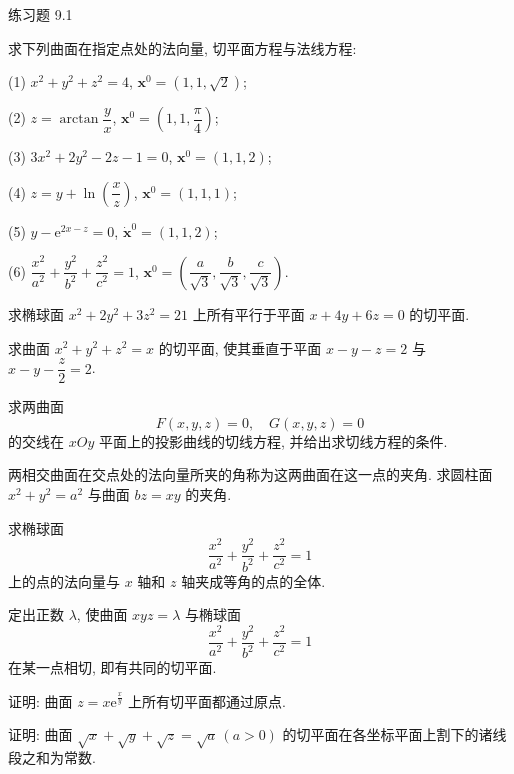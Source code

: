 \begin{exblock}{练习题 9.1}
  \item 求下列曲面在指定点处的法向量, 切平面方程与法线方程:

  (1) $x^{2} + y^{2} + z^{2} = 4$, $\boldsymbol{x}^{0} = \left(1, 1, \sqrt{2}\right)$;

  (2) $z = \arctan \dfrac{y}{x}$, $\boldsymbol{x}^{0} = \left(1, 1, \dfrac{\pi}{4}\right)$;

  (3) $3x^{2} + 2y^{2} - 2z - 1 = 0$, $\boldsymbol{x}^{0} = (1, 1, 2)$;

  (4) $z = y + \ln\left(\dfrac{x}{z}\right)$, $\boldsymbol{x}^{0} = (1, 1, 1)$;

  (5) $y - \mathrm{e}^{2x - z} = 0$, $\dot{\boldsymbol{x}}^{0} = (1, 1, 2)$;

  (6) $\dfrac{x^{2}}{a^{2}} + \dfrac{y^{2}}{b^{2}} + \dfrac{z^{2}}{c^{2}} = 1$,
  $\boldsymbol{x}^{0} = \left(\dfrac{a}{\sqrt{3}}, \dfrac{b}{\sqrt{3}}, \dfrac{c}{\sqrt{3}}\right)$.

  \item 求椭球面 $x^{2} + 2y^{2} + 3z^{2} = 21$ 上所有平行于平面 $x + 4y + 6z = 0$ 的切平面.

  \item 求曲面 $x^{2} + y^{2} + z^{2} = x$ 的切平面, 使其垂直于平面 $x - y - z = 2$ 与 $x - y - \dfrac{z}{2} = 2$.

  \item 求两曲面
  \[ F(x, y, z) = 0, \quad G(x, y, z) = 0 \]
  的交线在 $xOy$ 平面上的投影曲线的切线方程, 并给出求切线方程的条件.

  \item 两相交曲面在交点处的法向量所夹的角称为这两曲面在这一点的夹角. 求圆柱面 $x^{2} + y^{2} = a^{2}$ 与曲面 $bz = xy$ 的夹角.

  \item 求椭球面
  \[ \frac{x^{2}}{a^{2}} + \frac{y^{2}}{b^{2}} + \frac{z^{2}}{c^{2}} = 1 \]
  上的点的法向量与 $x$ 轴和 $z$ 轴夹成等角的点的全体.

  \item 定出正数 $\lambda$, 使曲面 $xyz = \lambda$ 与椭球面
  \[ \frac{x^{2}}{a^{2}} + \frac{y^{2}}{b^{2}} + \frac{z^{2}}{c^{2}} = 1 \]
  在某一点相切, 即有共同的切平面.

  \item 证明: 曲面 $z = x\mathrm{e}^{\frac{x}{y}}$ 上所有切平面都通过原点.

  \item 证明: 曲面 $\sqrt{x} + \sqrt{y} + \sqrt{z} = \sqrt{a}\,(a > 0)$ 的切平面在各坐标平面上割下的诸线段之和为常数.


\end{exblock}
